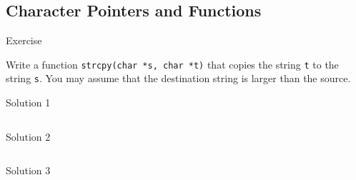 \documentclass[compress]{beamer}
\begin{document}
\subsection{Character Pointers and Functions}

\begin{slide}
	\begin{block}{Exercise}

	Write a function \texttt{strcpy(char *s, char *t)} that copies the string \texttt{t} to the string \texttt{s}.
	You may assume that the destination string is larger than the source.

	\end{block}
\end{slide}

\begin{slide}
	\begin{block}{Solution 1}

	\inputminted[fontsize=\scriptsize, firstline=10, linenos]{c}{
		\resDirectory/ls11-strcpy1.c
	}

	\end{block}
\end{slide}

\begin{slide}
	\begin{block}{Solution 2}

	\inputminted[fontsize=\scriptsize, firstline=10, linenos]{c}{
		\resDirectory/ls11-strcpy2.c
	}

	\end{block}
\end{slide}

\begin{slide}
	\begin{block}{Solution 3}

	\inputminted[fontsize=\scriptsize, firstline=10, linenos]{c}{
		\resDirectory/ls11-strcpy3.c
	}

	\end{block}
\end{slide}
\end{document}
